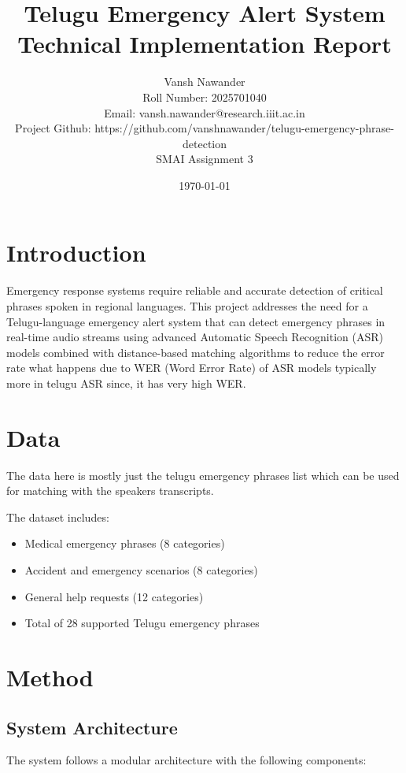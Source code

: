 \documentclass[11pt,a4paper]{article}
\title{\textbf{Telugu Emergency Alert System}\\
\large{Technical Implementation Report}}
\author{Vansh Nawander\\
\small{Roll Number: 2025701040}\\
\small{Email: vansh.nawander@research.iiit.ac.in}\\
\small{Project Github: https://github.com/vanshnawander/telugu-emergency-phrase-detection}\\
\small{SMAI Assignment 3}}
\date{\today}
\begin{document}
\maketitle

\section{Introduction}

Emergency response systems require reliable and accurate detection of critical phrases spoken in regional languages. This project addresses the need for a Telugu-language emergency alert system that can detect emergency phrases in real-time audio streams using advanced Automatic Speech Recognition (ASR) models combined with distance-based matching algorithms to reduce the error rate what happens due to WER (Word Error Rate) of ASR models typically more in telugu ASR since, it has very high WER. 

\section{Data}
The data here is mostly just the telugu emergency phrases list which can be used for matching with the speakers transcripts.

The dataset includes:
\begin{itemize}
    \item Medical emergency phrases (8 categories)
    \item Accident and emergency scenarios (8 categories)
    \item General help requests (12 categories)
    \item Total of 28 supported Telugu emergency phrases
\end{itemize}

\section{Method}

\subsection{System Architecture}

The system follows a modular architecture with the following components:
\end{document}
